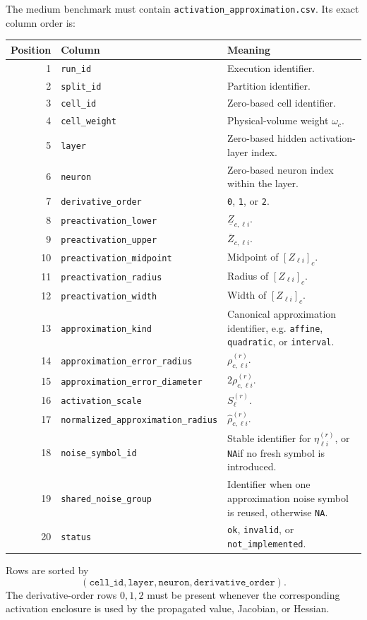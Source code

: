 \documentclass[11pt]{article}
\newcommand{\NA}{\texttt{NA}}
\begin{document}
The medium benchmark must contain
\texttt{activation\_approximation.csv}.  Its exact column order is:
\begin{center}
\small
\begin{tabularx}{\textwidth}{@{}r l X@{}}
\toprule
Position & Column & Meaning \\
\midrule
1 & \texttt{run\_id} & Execution identifier. \\
2 & \texttt{split\_id} & Partition identifier. \\
3 & \texttt{cell\_id} & Zero-based cell identifier. \\
4 & \texttt{cell\_weight} & Physical-volume weight \(\omega_c\). \\
5 & \texttt{layer} & Zero-based hidden activation-layer index. \\
6 & \texttt{neuron} & Zero-based neuron index within the layer. \\
7 & \texttt{derivative\_order} & \texttt{0}, \texttt{1}, or \texttt{2}. \\
8 & \texttt{preactivation\_lower} & \(\underline Z_{c,\ell i}\). \\
9 & \texttt{preactivation\_upper} & \(\overline Z_{c,\ell i}\). \\
10 & \texttt{preactivation\_midpoint} & Midpoint of \([Z_{\ell i}]_c\). \\
11 & \texttt{preactivation\_radius} & Radius of \([Z_{\ell i}]_c\). \\
12 & \texttt{preactivation\_width} & Width of \([Z_{\ell i}]_c\). \\
13 & \texttt{approximation\_kind} & Canonical approximation identifier, e.g. \texttt{affine}, \texttt{quadratic}, or \texttt{interval}. \\
14 & \texttt{approximation\_error\_radius} & \(\rho_{c,\ell i}^{(r)}\). \\
15 & \texttt{approximation\_error\_diameter} & \(2\rho_{c,\ell i}^{(r)}\). \\
16 & \texttt{activation\_scale} & \(S_\ell^{(r)}\). \\
17 & \texttt{normalized\_approximation\_radius} & \(\widehat\rho_{c,\ell i}^{(r)}\). \\
18 & \texttt{noise\_symbol\_id} & Stable identifier for \(\eta_{\ell i}^{(r)}\), or \NA if no fresh symbol is introduced. \\
19 & \texttt{shared\_noise\_group} & Identifier when one approximation noise symbol is reused, otherwise \NA. \\
20 & \texttt{status} & \texttt{ok}, \texttt{invalid}, or \texttt{not\_implemented}. \\
\bottomrule
\end{tabularx}
\end{center}
Rows are sorted by
\[
 (\texttt{cell\_id},\texttt{layer},\texttt{neuron},
 \texttt{derivative\_order}).
\]
The derivative-order rows \(0,1,2\) must be present whenever the corresponding
activation enclosure is used by the propagated value, Jacobian, or Hessian.
\end{document}
